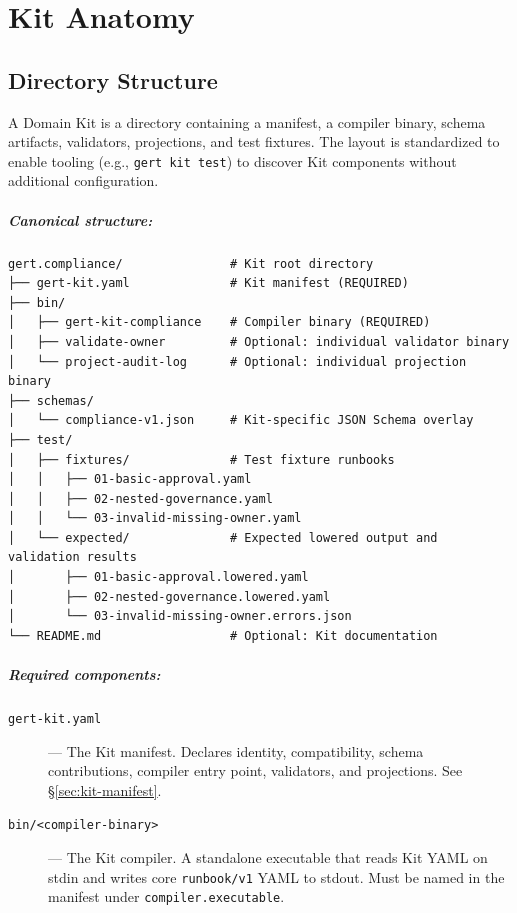 
\chapter{Kit Anatomy}
\label{ch:kit-anatomy}

\section{Directory Structure}
\label{sec:kit-directory}

A Domain Kit is a directory containing a manifest, a compiler binary, schema
artifacts, validators, projections, and test fixtures. The layout is
standardized to enable tooling (e.g., \texttt{gert kit test}) to discover Kit
components without additional configuration.

\paragraph{Canonical structure:}

\begin{verbatim}
gert.compliance/               # Kit root directory
├── gert-kit.yaml              # Kit manifest (REQUIRED)
├── bin/
│   ├── gert-kit-compliance    # Compiler binary (REQUIRED)
│   ├── validate-owner         # Optional: individual validator binary
│   └── project-audit-log      # Optional: individual projection binary
├── schemas/
│   └── compliance-v1.json     # Kit-specific JSON Schema overlay
├── test/
│   ├── fixtures/              # Test fixture runbooks
│   │   ├── 01-basic-approval.yaml
│   │   ├── 02-nested-governance.yaml
│   │   └── 03-invalid-missing-owner.yaml
│   └── expected/              # Expected lowered output and validation results
│       ├── 01-basic-approval.lowered.yaml
│       ├── 02-nested-governance.lowered.yaml
│       └── 03-invalid-missing-owner.errors.json
└── README.md                  # Optional: Kit documentation
\end{verbatim}

\paragraph{Required components:}

\begin{description}
  \item[\texttt{gert-kit.yaml}] --- The Kit manifest. Declares identity,
    compatibility, schema contributions, compiler entry point, validators, and
    projections. See \S\ref{sec:kit-manifest}.

  \item[\texttt{bin/<compiler-binary>}] --- The Kit compiler. A standalone
    executable that reads Kit YAML on stdin and writes core
    \texttt{runbook/v1} YAML to stdout. Must be named in the manifest under
    \texttt{compiler.executable}.
\end{description}

